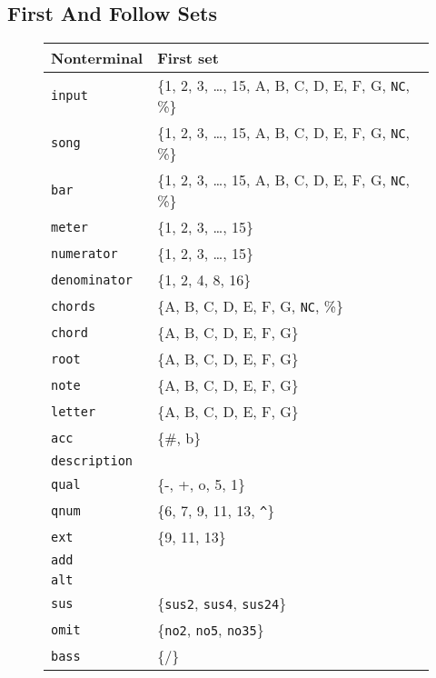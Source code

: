 \documentclass{article}
\begin{document}
\subsection{First And Follow Sets}
\begin{figure}[H]
    \def\arraystretch{1.5}%
    \begin{tabularx}{\textwidth}{l|X}
        Nonterminal & First set \\
        \hline 
        \hline 
        \lstinline|input| & \{1, 2, 3, \ldots, 15, A, B, C, D, E, F, G, \lstinline|NC|, \%\} \\ 
        \hline 
        \lstinline|song| & \{1, 2, 3, \ldots, 15, A, B, C, D, E, F, G, \lstinline|NC|, \%\} \\ 
        \hline
        \lstinline|bar| & \{1, 2, 3, \ldots, 15, A, B, C, D, E, F, G, \lstinline|NC|, \%\} \\ 
        \hline 
        \lstinline|meter| & \{1, 2, 3, \ldots, 15\} \\ 
        \hline 
        \lstinline|numerator| & \{1, 2, 3, \ldots, 15\} \\ 
        \hline 
        \lstinline|denominator| & \{1, 2, 4, 8, 16\} \\ 
        \hline 
        \lstinline|chords| & \{A, B, C, D, E, F, G, \lstinline|NC|, \%\} \\
        \hline
        \lstinline|chord| & \{A, B, C, D, E, F, G\} \\
        \hline 
        \lstinline|root| & \{A, B, C, D, E, F, G\} \\
        \hline
        \lstinline|note| & \{A, B, C, D, E, F, G\} \\
        \hline
        \lstinline|letter| & \{A, B, C, D, E, F, G\} \\
        \hline 
        \lstinline|acc| & \{\#, b\}\\
        \hline 
        \lstinline|description| &\\
        \hline 
        \lstinline|qual| & \{-, +, o, 5, 1\}\\
        \hline 
        \lstinline|qnum| & \{6, 7, 9, 11, 13, \lstinline|^|\}\\
        \hline 
        \lstinline|ext| & \{9, 11, 13\} \\
        \hline 
        \lstinline|add| & \\
        \hline 
        \lstinline|alt| & \\
        \hline 
        \lstinline|sus| & \{\texttt{sus2}, \texttt{sus4}, \texttt{sus24}\} \\
        \hline 
        \lstinline|omit| & \{\texttt{no2}, \texttt{no5}, \texttt{no35}\} \\
        \hline 
        \lstinline|bass| & \{/\} \\
        \hline
    \end{tabularx}
\end{figure}
\end{document}
